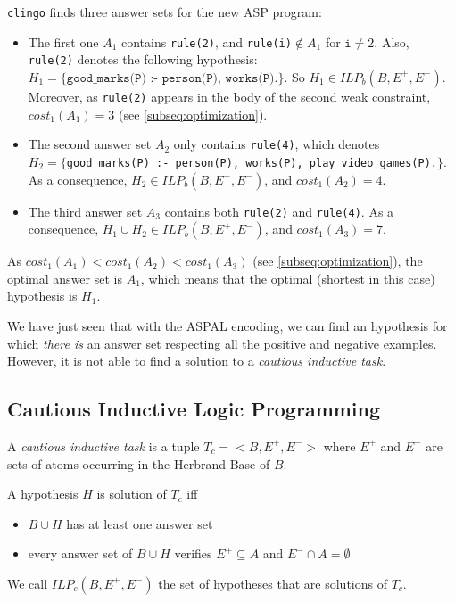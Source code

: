 \texttt{clingo} finds three answer sets for the new ASP program:
\begin{itemize}
\item The first one $A_1$ contains \texttt{rule(2)}, and \texttt{rule(i)}$\not \in A_1$ for $\texttt{i}\neq 2$. Also, \texttt{rule(2)} denotes the following hypothesis: $H_1=\{\texttt{good\_marks(P) :- person(P), works(P).}\}$. So $H_1\in ILP_b(B,E^+,E^-)$. Moreover, as  \texttt{rule(2)} appears in the body of the second weak constraint, $cost_{1}(A_1)=3$ (see \ref{subseq:optimization}).

\item The second answer set $A_2$ only contains \texttt{rule(4)}, which denotes \\$H_2=\{$\texttt{good\_marks(P) :- person(P), works(P), play\_video\_games(P).}$\}$. As a consequence, $H_2\in ILP_b(B,E^+,E^-)$, and $cost_{1}(A_2)=4$.

\item The third answer set $A_3$ contains both \texttt{rule(2)} and \texttt{rule(4)}. As a consequence, $H_1\cup H_2 \in ILP_b(B,E^+,E^-)$, and $cost_{1}(A_3)=7$.

\end{itemize} 

As $cost_{1}(A_1)<cost_{1}(A_2)<cost_{1}(A_3)$ (see \ref{subseq:optimization}), the optimal answer set is $A_1$, which means that the optimal (shortest in this case) hypothesis is $H_1$. 

\bigskip

We have just seen that with the ASPAL encoding, we can find an hypothesis for which \textit{there is} an answer set respecting all the positive and negative examples. However, it is not able to find a solution to a \textit{cautious inductive task}. 

\subsection{Cautious Inductive Logic Programming}

\begin{definition}

A \textit{cautious inductive task} is a tuple $T_c=<B, E^+, E^->$ where $E^+$ and $E^-$ are sets of atoms occurring in the Herbrand Base of $B$.

\smallskip

A hypothesis $H$ is solution of $T_c$ iff 
\begin{itemize}
\item $B\cup H$ has at least one answer set
\item every answer set of $B\cup H$ verifies $E^+\subseteq A$ and $E^-\cap A = \emptyset$
\end{itemize}

\smallskip

We call $ILP_c(B,E^+,E^-)$ the set of hypotheses that are solutions of $T_c$. 

\end{definition}

